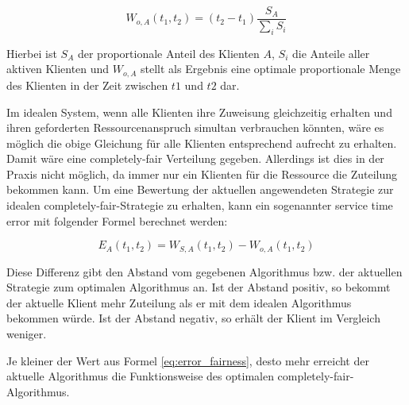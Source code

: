 \begin{equation}
W_{o,A}(t_1,t_2) = (t_2 - t_1) \frac{S_A}{\sum_i S_i}
\label{eq:perfect_fairness}
\end{equation}

Hierbei ist $S_A$ der proportionale Anteil des Klienten $A$, $S_i$ die Anteile aller aktiven Klienten und $W_{o,A}$ stellt als Ergebnis eine optimale proportionale Menge des Klienten in der Zeit zwischen $t1$ und $t2$ dar.

Im idealen System, wenn alle Klienten ihre Zuweisung gleichzeitig erhalten und ihren geforderten Ressourcenanspruch simultan verbrauchen könnten, wäre es möglich die obige Gleichung für alle Klienten entsprechend aufrecht zu erhalten.
Damit wäre eine \glqq completely-fair\grqq{} Verteilung gegeben. Allerdings ist dies in der Praxis nicht möglich, da immer nur ein Klienten für die Ressource die Zuteilung bekommen kann.
Um eine Bewertung der aktuellen angewendeten Strategie zur idealen \glqq completely-fair\grqq-Strategie zu erhalten, kann ein sogenannter \glqq service time error\grqq{} mit folgender Formel berechnet werden:

\begin{equation}
E_A(t_1,t_2) = W_{S,A}(t_1,t_2) - W_{o,A}(t_1,t_2)
\label{eq:error_fairness}
\end{equation}

Diese Differenz gibt den Abstand vom gegebenen Algorithmus bzw. der aktuellen Strategie zum optimalen Algorithmus an.
Ist der Abstand positiv, so bekommt der aktuelle Klient mehr Zuteilung als er mit dem idealen Algorithmus bekommen würde. Ist der Abstand negativ, so erhält der Klient im Vergleich weniger.

Je kleiner der Wert aus Formel \ref{eq:error_fairness}, desto mehr erreicht der aktuelle Algorithmus die Funktionsweise des optimalen \glqq completely-fair\grqq{}-Algorithmus.
 



